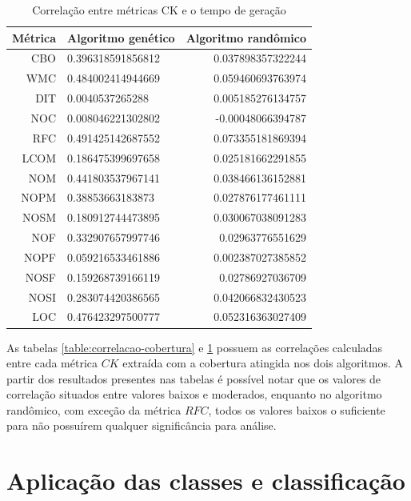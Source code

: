 \documentclass[
	12pt,				%
	oneside,			%
	a4paper,			%
	english,			%
	brazil				%
	]{abntex2ppgsi}
\begin{document}
\begin{table}[h]
\centering
\caption{Correlação entre métricas CK e o tempo de geração}
\vspace{0.5cm}
\begin{tabular}{r|lr}

										
Métrica & Algoritmo genético & Algoritmo randômico \\ %
\hline                               %
CBO		& 0.396318591856812		& 0.037898357322244 \\
WMC		& 0.484002414944669		& 0.059460693763974 \\
DIT		& 0.0040537265288		& 0.005185276134757 \\
NOC		& 0.008046221302802		& -0.00048066394787 \\
RFC		& 0.491425142687552		& 0.073355181869394 \\
LCOM		& 0.186475399697658	& 	0.025181662291855 \\
NOM		& 0.441803537967141		& 0.038466136152881 \\
NOPM		& 0.38853663183873		& 0.027876177461111 \\
NOSM		& 0.180912744473895	& 	0.030067038091283 \\
NOF		& 0.332907657997746	& 	0.02963776551629 \\
NOPF		& 0.059216533461886	& 	0.002387027385852 \\
NOSF		& 0.159268739166119		& 0.02786927036709 \\
NOSI		& 0.283074420386565		& 0.042066832430523 \\
LOC		& 0.476423297500777	& 0.052316363027409
\end{tabular}
\label{table:correlacao-tempo}
\end{table}

As tabelas \ref{table:correlacao-cobertura} e \ref{table:correlacao-tempo} possuem as correlações calculadas entre cada métrica $CK$ extraída com a cobertura atingida nos dois algoritmos. A partir dos resultados presentes nas tabelas é possível notar que os valores de correlação situados entre valores baixos e moderados, enquanto no algoritmo randômico, com exceção da métrica $RFC$, todos os valores baixos o suficiente para não possuírem qualquer significância para análise.

\section{Aplicação das classes e classificação}
\end{document}
